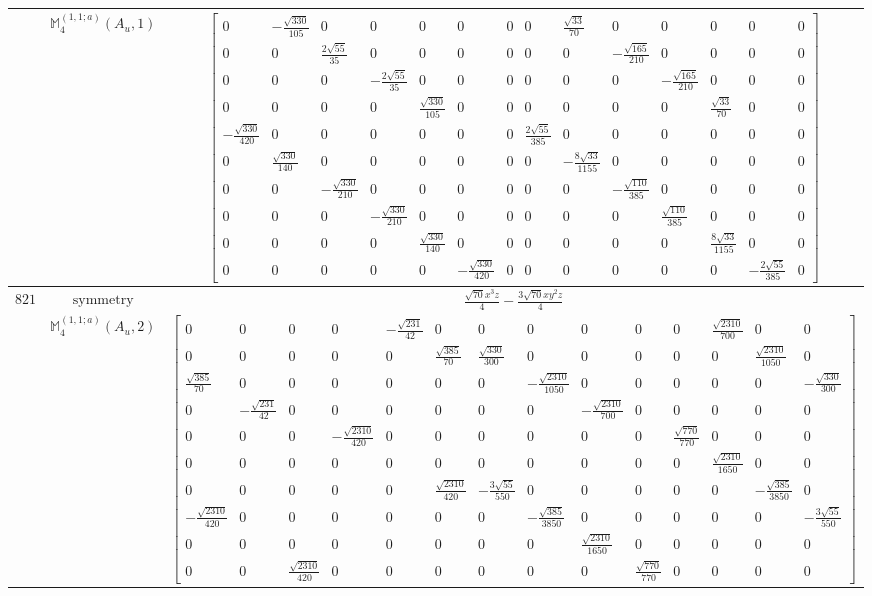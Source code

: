 \documentclass[fleqn,8pt,landscape]{jsarticle}
\begin{document}
\begin{longtable}{ccc}
$  $ & $ \mathbb{M}_{4}^{(1,1;a)}(A_{u},1) $ & $ \begin{bmatrix} 0 & - \frac{\sqrt{330}}{105} & 0 & 0 & 0 & 0 & 0 & 0 & \frac{\sqrt{33}}{70} & 0 & 0 & 0 & 0 & 0 \\ 0 & 0 & \frac{2 \sqrt{55}}{35} & 0 & 0 & 0 & 0 & 0 & 0 & - \frac{\sqrt{165}}{210} & 0 & 0 & 0 & 0 \\ 0 & 0 & 0 & - \frac{2 \sqrt{55}}{35} & 0 & 0 & 0 & 0 & 0 & 0 & - \frac{\sqrt{165}}{210} & 0 & 0 & 0 \\ 0 & 0 & 0 & 0 & \frac{\sqrt{330}}{105} & 0 & 0 & 0 & 0 & 0 & 0 & \frac{\sqrt{33}}{70} & 0 & 0 \\ - \frac{\sqrt{330}}{420} & 0 & 0 & 0 & 0 & 0 & 0 & \frac{2 \sqrt{55}}{385} & 0 & 0 & 0 & 0 & 0 & 0 \\ 0 & \frac{\sqrt{330}}{140} & 0 & 0 & 0 & 0 & 0 & 0 & - \frac{8 \sqrt{33}}{1155} & 0 & 0 & 0 & 0 & 0 \\ 0 & 0 & - \frac{\sqrt{330}}{210} & 0 & 0 & 0 & 0 & 0 & 0 & - \frac{\sqrt{110}}{385} & 0 & 0 & 0 & 0 \\ 0 & 0 & 0 & - \frac{\sqrt{330}}{210} & 0 & 0 & 0 & 0 & 0 & 0 & \frac{\sqrt{110}}{385} & 0 & 0 & 0 \\ 0 & 0 & 0 & 0 & \frac{\sqrt{330}}{140} & 0 & 0 & 0 & 0 & 0 & 0 & \frac{8 \sqrt{33}}{1155} & 0 & 0 \\ 0 & 0 & 0 & 0 & 0 & - \frac{\sqrt{330}}{420} & 0 & 0 & 0 & 0 & 0 & 0 & - \frac{2 \sqrt{55}}{385} & 0 \end{bmatrix} $ \\ \hline
$ 821 $ & $ \text{symmetry} $ & $ \frac{\sqrt{70} x^{3} z}{4} - \frac{3 \sqrt{70} x y^{2} z}{4} $ \\
$  $ & $ \mathbb{M}_{4}^{(1,1;a)}(A_{u},2) $ & $ \begin{bmatrix} 0 & 0 & 0 & 0 & - \frac{\sqrt{231}}{42} & 0 & 0 & 0 & 0 & 0 & 0 & \frac{\sqrt{2310}}{700} & 0 & 0 \\ 0 & 0 & 0 & 0 & 0 & \frac{\sqrt{385}}{70} & \frac{\sqrt{330}}{300} & 0 & 0 & 0 & 0 & 0 & \frac{\sqrt{2310}}{1050} & 0 \\ \frac{\sqrt{385}}{70} & 0 & 0 & 0 & 0 & 0 & 0 & - \frac{\sqrt{2310}}{1050} & 0 & 0 & 0 & 0 & 0 & - \frac{\sqrt{330}}{300} \\ 0 & - \frac{\sqrt{231}}{42} & 0 & 0 & 0 & 0 & 0 & 0 & - \frac{\sqrt{2310}}{700} & 0 & 0 & 0 & 0 & 0 \\ 0 & 0 & 0 & - \frac{\sqrt{2310}}{420} & 0 & 0 & 0 & 0 & 0 & 0 & \frac{\sqrt{770}}{770} & 0 & 0 & 0 \\ 0 & 0 & 0 & 0 & 0 & 0 & 0 & 0 & 0 & 0 & 0 & \frac{\sqrt{2310}}{1650} & 0 & 0 \\ 0 & 0 & 0 & 0 & 0 & \frac{\sqrt{2310}}{420} & - \frac{3 \sqrt{55}}{550} & 0 & 0 & 0 & 0 & 0 & - \frac{\sqrt{385}}{3850} & 0 \\ - \frac{\sqrt{2310}}{420} & 0 & 0 & 0 & 0 & 0 & 0 & - \frac{\sqrt{385}}{3850} & 0 & 0 & 0 & 0 & 0 & - \frac{3 \sqrt{55}}{550} \\ 0 & 0 & 0 & 0 & 0 & 0 & 0 & 0 & \frac{\sqrt{2310}}{1650} & 0 & 0 & 0 & 0 & 0 \\ 0 & 0 & \frac{\sqrt{2310}}{420} & 0 & 0 & 0 & 0 & 0 & 0 & \frac{\sqrt{770}}{770} & 0 & 0 & 0 & 0 \end{bmatrix} $ \\ \hline

\end{longtable}
\end{document}
